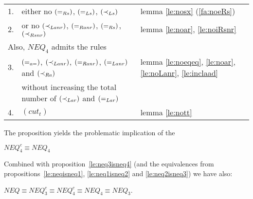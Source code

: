 \hspace*{-1em}\begin{tabular}{rll}
1.& either no $(=_{Rs})$, $(=_{Ls})$, $(\mathbin{\prec}_{Ls})$ 
 & lemma  \ref{le:nosx} (\ref{fa:noeRs}) \\ %
2.& or no $(\mathbin{\prec}_{Lanr})$, $(=_{Ranr})$, $(=_{Rs})$, $(\mathbin{\prec}_{Rsnr})$
 & lemma \ref{le:noar}, \ref{le:noiRsnr} \\[.5ex]
\multicolumn{3}{l}{\hspace*{-1em}Also, $NEQ_4$ admits the rules} \\[.5ex]
3.& $(=_{a=})$, $(\mathbin{\prec}_{Lanr})$, $(=_{Ranr})$, $(=_{Lanr})$  and $(\mathbin{\prec}_{Ra})$ 
 & lemma \ref{le:noeqeq}, \ref{le:noar}, \ref{le:noLanr}, \ref{le:inclaad} 
 \\[.5ex]
& without increasing the total number of $(\mathbin{\prec}_{Lar})$ and $(=_{Lar})$  \\[.5ex]
4.& $(cut_t)$    %
  & lemma \ref{le:nott} %
\end{tabular} 

 
%
\noindent
The proposition yields the problematic implication of the 
\begin{THEOREM}\label{th:neq4cisneq4}
 $NEQ_4^c \equiv NEQ_4$ \end{THEOREM}
Combined with proposition~\ref{le:neq3isneq4} (and the equivalences 
from propositions~\ref{le:neqisneq1}, \ref{le:neq1isneq2} and \ref{le:neq2isneq3})
we have also:
\begin{COROLLARY}\label{co:Allequiv}
$NEQ\equiv NEQ_3^c \equiv NEQ_4^c \equiv NEQ_4 \equiv NEQ_3$.
\end{COROLLARY}

